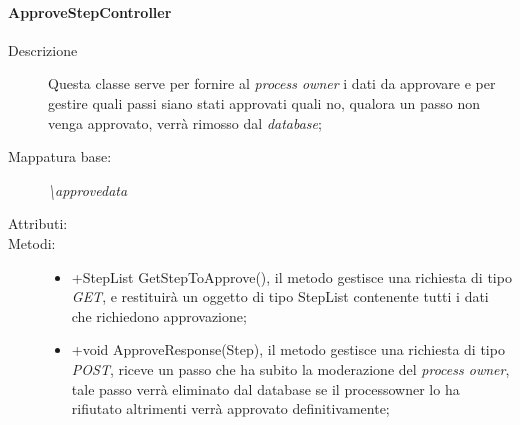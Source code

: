\paragraph{ApproveStepController}%
\begin{description}
	\item[Descrizione] Questa classe serve per fornire al \textit{process owner} i dati da approvare e per gestire quali passi siano stati approvati quali no, qualora un passo non venga approvato, verrà rimosso dal \textit{database};
	\item[Mappatura base:] \textit{\textbackslash approvedata}
	\item[Attributi:] 
	\item[Metodi:]\begin{itemize}
					\item +StepList GetStepToApprove(), il metodo gestisce una richiesta di tipo \textit{GET}, e restituirà un oggetto di tipo StepList contenente tutti i dati che richiedono approvazione;
					\item +void ApproveResponse(Step), il metodo gestisce una richiesta di tipo \textit{POST}, riceve un passo che ha subito la moderazione del \textit{process owner}, tale passo verrà eliminato dal database se il processowner lo ha rifiutato altrimenti verrà approvato definitivamente;  
				\end{itemize}
\end{description}